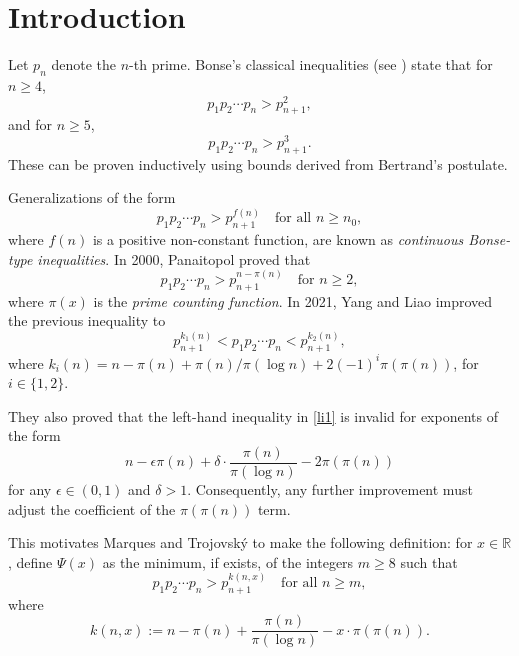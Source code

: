 \documentclass[10pt]{amsart}
\theoremstyle{definition} %
\numberwithin{equation}{section}
\begin{document}
\maketitle

\tableofcontents

\section{Introduction}\label{sec1}


Let $p_n$ denote the $n$-th prime. Bonse's classical inequalities (see \cite{boriginal}) state that for $n \geq 4$,
\begin{equation}\label{bo1}
p_1p_2\cdots p_n > p_{n+1}^2,
\end{equation}
and for $n \geq 5$,
\begin{equation}\label{bo2}
p_1p_2\cdots p_n > p_{n+1}^3.
\end{equation}
These can be proven inductively using bounds derived from Bertrand's postulate.

Generalizations of the form
\[
p_1p_2\cdots p_n > p_{n+1}^{f(n)} \quad \text{for all } n \geq n_0,
\]
where $f(n)$ is a positive non-constant function, are known as \emph{continuous Bonse-type inequalities}. In 2000, Panaitopol \cite{papa} proved that
\[
p_1p_2\cdots p_n > p_{n+1}^{n - \pi(n)} \quad \text{for } n \geq 2,
\]
where $\pi(x)$ is the \emph{prime counting function}. In 2021, Yang and Liao \cite{bonse} improved the previous inequality to
\begin{equation}\label{li1}
p_{n+1}^{k_1(n)}<p_1p_2\cdots p_n <p_{n+1}^{k_2(n)},
\end{equation}
where $k_i(n) = n-\pi(n)+ \pi(n)/\pi(\log n) + 2(-1)^{i}\pi(\pi(n))$, for $i\in \{1,2\}$. 

They also proved that the left-hand inequality in \eqref{li1} is invalid for exponents of the form
\[
n - \epsilon\pi(n) + \delta\cdot\frac{\pi(n)}{\pi(\log n)} - 2\pi(\pi(n))
\]
for any $\epsilon \in (0,1)$ and $\delta > 1$. Consequently, any further improvement must adjust the coefficient of the $\pi(\pi(n))$ term.

This motivates Marques and Trojovsk\' y \cite{mt1} to make the following definition: for $x \in \mathbb{R}$, define $\Psi(x)$ as the minimum, if exists, of the integers $m\geq 8$ such that
\begin{equation}\label{boc}
p_1p_2\cdots p_n > p_{n+1}^{k(n,x)} \quad \text{for all } n \geq m,
\end{equation}
where
\[
k(n,x) := n - \pi(n) + \frac{\pi(n)}{\pi(\log n)} - x \cdot \pi(\pi(n)).
\]
\end{document}
